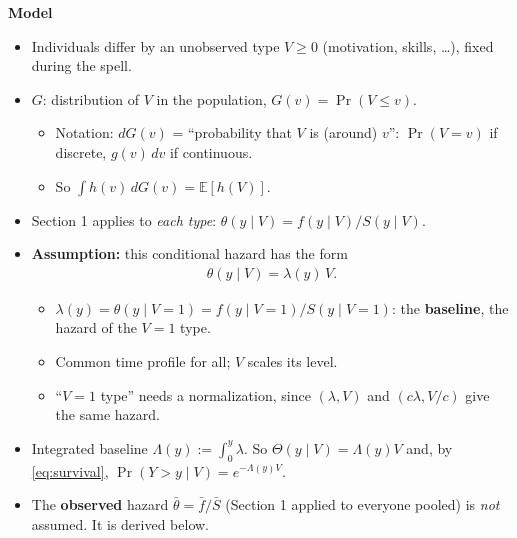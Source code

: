 \documentclass[11pt]{article}
\newcommand{\E}{\mathbb{E}}
\newcommand{\1}{\mathbf{1}}
\begin{document}
\textbf{Model}
\begin{itemize}
  \item Individuals differ by an unobserved type $V\ge0$ (motivation, skills, \ldots), fixed during the spell.
  \item $G$: distribution of $V$ in the population, $G(v)=\Pr(V\le v)$.
    \begin{itemize}
      \item Notation: $dG(v)$ = ``probability that $V$ is (around) $v$'': $\Pr(V=v)$ if discrete, $g(v)\,dv$ if continuous.
      \item So $\int h(v)\,dG(v)=\E[h(V)]$.
    \end{itemize}
  \item Section 1 applies to \emph{each type}: $\theta(y\mid V)=f(y\mid V)/S(y\mid V)$.
  \item \textbf{Assumption:} this conditional hazard has the form
  \begin{align}
    \theta(y\mid V)=\lambda(y)\,V. \nonumber
  \end{align}
    \begin{itemize}
      \item $\lambda(y)=\theta(y\mid V=1)=f(y\mid V=1)/S(y\mid V=1)$: the \textbf{baseline}, the hazard of the $V=1$ type.
      \item Common time profile for all; $V$ scales its level.
      \item ``$V=1$ type'' needs a normalization, since $(\lambda,V)$ and $(c\lambda,V/c)$ give the same hazard.
    \end{itemize}
  \item Integrated baseline $\Lambda(y):=\int_0^y\lambda$. So $\Theta(y\mid V)=\Lambda(y)V$ and, by \eqref{eq:survival}, $\Pr(Y>y\mid V)=e^{-\Lambda(y)V}$.
  \item The \textbf{observed} hazard $\bar\theta=\bar f/\bar S$ (Section 1 applied to everyone pooled) is \emph{not} assumed. It is derived below.
\end{itemize}
\end{document}
